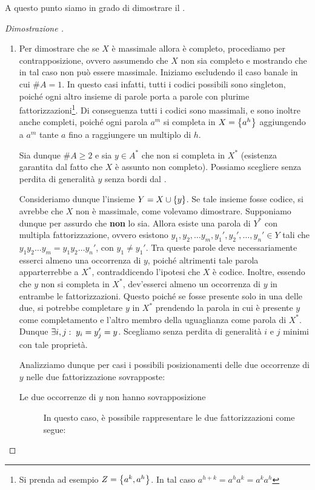 A questo punto siamo in grado di dimostrare il .
\begin{proof}[Dimostrazione ]
  \begin{enumerate}
    \item Per dimostrare che se \(X\) è massimale allora è completo, procediamo per contrapposizione, ovvero assumendo che \(X\) non sia completo e mostrando che in tal caso non può essere massimale.
      Iniziamo escludendo il caso banale in cui \(\# A = 1\). In questo casi infatti, tutti i codici possibili sono singleton, poiché ogni altro insieme di parole porta a parole con plurime fattorizzazioni\footnote{Si prenda ad esempio \(Z = \set{a^k,a^h}\). In tal caso \(a^{h+k} = a^h a^k = a^k a^h\)}.
      Di conseguenza tutti i codici sono massimali, e sono inoltre anche completi, poiché ogni parola \(a^m\) si completa in \(X = \set{a^h}\) aggiungendo a \(a^m\) tante \(a\) fino a raggiungere un multiplo di \(h\).

      Sia dunque \(\# A \geq 2\) e sia \(y \in A^*\) che non si completa in \(X^*\) (esistenza garantita dal fatto che \(X\) è assunto non completo).
      Possiamo scegliere senza perdita di generalità \(y\) senza bordi dal .

      Consideriamo dunque l'insieme \(Y=X\cup\set{y}\). Se tale insieme fosse codice, si avrebbe che \(X\) non è massimale, come volevamo dimostrare.
      Supponiamo dunque per assurdo che \textbf{non} lo sia.
      Allora esiste una parola di \(Y^*\) con multipla fattorizzazione, ovvero esistono \(y_1,y_2,\ldots y_m,y_1',y_2',\ldots,y_n' \in Y\) tali che \(y_1y_2\ldots y_m = y_1y_2\ldots y_n'\), con \(y_1\neq y_1'\).
      Tra queste parole deve necessariamente esserci almeno una occorrenza di \(y\), poiché altrimenti tale parola apparterrebbe a \(X^*\), contraddicendo l'ipotesi che \(X\) è codice.
      Inoltre, essendo che \(y\) non si completa in \(X^*\), dev'esserci almeno un occorrenza di \(y\) in entrambe le fattorizzazioni.
      Questo poiché se fosse presente solo in una delle due, si potrebbe completare \(y\) in \(X^*\) prendendo la parola in cui è presente \(y\) come completamento e l'altro membro della uguaglianza come parola di \(X^*\).
      Dunque \(\exists i,j :\; y_i=y_j'=y\). Scegliamo senza perdita di generalità \(i\) e \(j\) minimi con tale proprietà.

      Analizziamo dunque per casi i possibili posizionamenti delle due occorrenze di \(y\) nelle due fattorizzazione sovrapposte:
      \begin{description}
        \item[Le due occorrenze di \(y\) non hanno sovrapposizione]
          In questo caso, è possibile rappresentare le due fattorizzazioni come segue:
          \begin{figure}[H]
            \centering
\end{figure}
\end{description}
\end{enumerate}
\end{proof}
